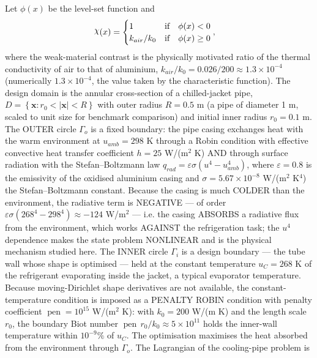 \documentclass[preview]{standalone}
\begin{document}
Let $\phi(x)$ be the level-set function and
 \begin{align*}\raisebox{\depth}{$\chi$}(x) &= \begin{cases} 1 & \mbox{if}\quad \phi(x) < 0 \\ k_{air}/k_0 & \mbox{if}\quad \phi(x)  \ge 0 \end{cases},\end{align*}
where the weak-material contrast is the physically motivated ratio of the thermal conductivity of air to that of aluminium, $k_{air}/k_0 = 0.026/200 \approx 1.3 \times 10^{-4}$ (numerically $1.3 \times 10^{-4}$, the value taken by the characteristic function).
The design domain is the annular cross-section of a chilled-jacket pipe, $D = \left\{ \mathbf x : r_0 < \left|\mathbf x\right| < R \right\}$ with outer radius $R = 0.5$ m (a pipe of diameter 1 m, scaled to unit size for benchmark comparison) and initial inner radius $r_0 = 0.1$ m.  The OUTER circle $\Gamma_o$ is a fixed boundary: the pipe casing exchanges heat with the warm environment at $u_{amb} = 298$ K through a Robin condition with effective convective heat transfer coefficient $h = 25$ W/(m$^{2}$ K) AND through surface radiation with the Stefan--Boltzmann law $q_{rad} = \varepsilon \sigma \left( u^{4} - u_{amb}^{4}\right)$, where $\varepsilon = 0.8$ is the emissivity of the oxidised aluminium casing and $\sigma = 5.67 \times 10^{-8}$ W/(m$^{2}$ K$^{4}$) the Stefan--Boltzmann constant.  Because the casing is much COLDER than the environment, the radiative term is NEGATIVE — of order $\varepsilon \sigma \left(268^{4} - 298^{4}\right) \approx -124$ W/m$^{2}$ — i.e. the casing ABSORBS a radiative flux from the environment, which works AGAINST the refrigeration task; the $u^{4}$ dependence makes the state problem NONLINEAR and is the physical mechanism studied here.  The INNER circle $\Gamma_i$ is a design boundary — the tube wall whose shape is optimised — held at the constant temperature $u_C = 268$ K of the refrigerant evaporating inside the jacket, a typical evaporator temperature.  Because moving-Dirichlet shape derivatives are not available, the constant-temperature condition is imposed as a PENALTY ROBIN condition with penalty coefficient $\operatorname{pen} = 10^{15}$ W/(m$^{2}$ K): with $k_0 = 200$ W/(m K) and the length scale $r_0$, the boundary Biot number $\operatorname{pen}\, r_0 / k_0 \approx 5 \times 10^{11}$ holds the inner-wall temperature within $10^{-9}\%$ of $u_C$.  The optimisation maximises the heat absorbed from the environment through $\Gamma_o$.
The Lagrangian of the cooling-pipe problem is
\end{document}
